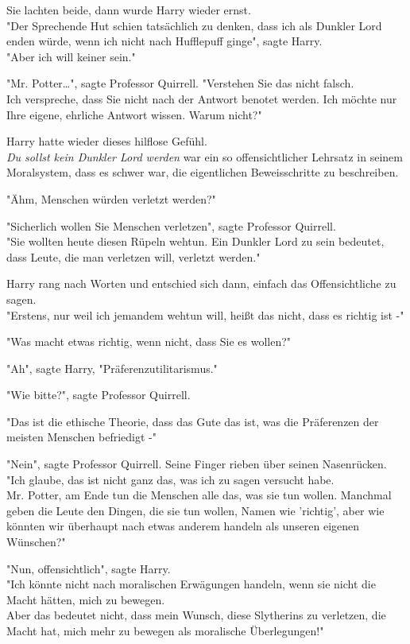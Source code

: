 {Sie lachten beide, dann wurde Harry wieder ernst.\\ "Der Sprechende Hut schien tatsächlich zu denken, dass ich als Dunkler Lord enden würde, wenn ich nicht nach Hufflepuff ginge", sagte Harry.\\ "Aber ich will keiner sein."

"Mr. Potter…", sagte Professor Quirrell. "Verstehen Sie das nicht falsch.\\ Ich verspreche, dass Sie nicht nach der Antwort benotet werden. Ich möchte nur Ihre eigene, ehrliche Antwort wissen. Warum nicht?"

Harry hatte wieder dieses hilflose Gefühl.\\ \emph{Du sollst kein Dunkler Lord werden} war ein so offensichtlicher Lehrsatz in seinem Moralsystem, dass es schwer war, die eigentlichen Beweisschritte zu beschreiben.

"Ähm, Menschen würden verletzt werden?"

"Sicherlich wollen Sie Menschen verletzen", sagte Professor Quirrell.\\ "Sie wollten heute diesen Rüpeln wehtun. Ein Dunkler Lord zu sein bedeutet, dass Leute, die man verletzen will, verletzt werden."

Harry rang nach Worten und entschied sich dann, einfach das Offensichtliche zu sagen.\\ "Erstens, nur weil ich jemandem wehtun will, heißt das nicht, dass es richtig ist -"

"Was macht etwas richtig, wenn nicht, dass Sie es wollen?"

"Ah", sagte Harry, "Präferenzutilitarismus."

"Wie bitte?", sagte Professor Quirrell.

"Das ist die ethische Theorie, dass das Gute das ist, was die Präferenzen der meisten Menschen befriedigt -"

"Nein", sagte Professor Quirrell. Seine Finger rieben über seinen Nasenrücken.\\ "Ich glaube, das ist nicht ganz das, was ich zu sagen versucht habe.\\ Mr. Potter, am Ende tun die Menschen alle das, was sie tun wollen. Manchmal geben die Leute den Dingen, die sie tun wollen, Namen wie 'richtig', aber wie könnten wir überhaupt nach etwas anderem handeln als unseren eigenen Wünschen?"

"Nun, offensichtlich", sagte Harry.\\ "Ich könnte nicht nach moralischen Erwägungen handeln, wenn sie nicht die Macht hätten, mich zu bewegen.\\ Aber das bedeutet nicht, dass mein Wunsch, diese Slytherins zu verletzen, die Macht hat, mich mehr zu bewegen als moralische Überlegungen!"

}
